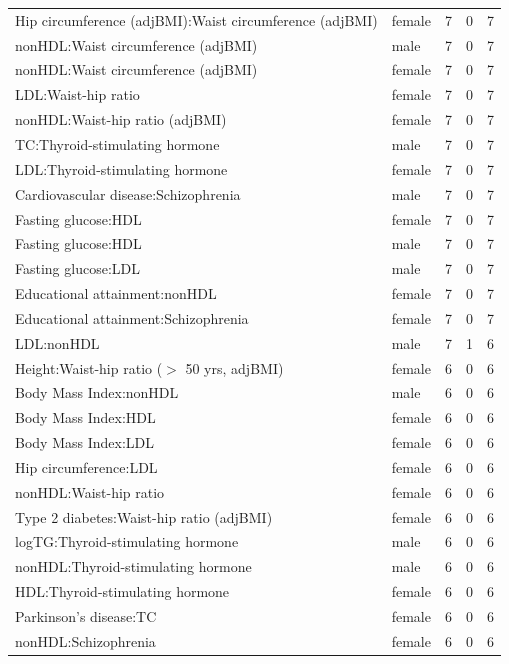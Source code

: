 \begin{table}[ht]
\begin{tabular}{llrrr}
  Hip circumference (adjBMI):Waist circumference (adjBMI) & female &   7 &   0 &   7 \\ 
  nonHDL:Waist circumference (adjBMI) & male &   7 &   0 &   7 \\ 
  nonHDL:Waist circumference (adjBMI) & female &   7 &   0 &   7 \\ 
  LDL:Waist-hip ratio & female &   7 &   0 &   7 \\ 
  nonHDL:Waist-hip ratio (adjBMI) & female &   7 &   0 &   7 \\ 
  TC:Thyroid-stimulating hormone & male &   7 &   0 &   7 \\ 
  LDL:Thyroid-stimulating hormone & female &   7 &   0 &   7 \\ 
  Cardiovascular disease:Schizophrenia & male &   7 &   0 &   7 \\ 
  Fasting glucose:HDL & female &   7 &   0 &   7 \\ 
  Fasting glucose:HDL & male &   7 &   0 &   7 \\ 
  Fasting glucose:LDL & male &   7 &   0 &   7 \\ 
  Educational attainment:nonHDL & female &   7 &   0 &   7 \\ 
  Educational attainment:Schizophrenia & female &   7 &   0 &   7 \\ 
  LDL:nonHDL & male &   7 &   1 &   6 \\ 
  Height:Waist-hip ratio ($>$ 50 yrs, adjBMI) & female &   6 &   0 &   6 \\ 
  Body Mass Index:nonHDL & male &   6 &   0 &   6 \\ 
  Body Mass Index:HDL & female &   6 &   0 &   6 \\ 
  Body Mass Index:LDL & female &   6 &   0 &   6 \\ 
  Hip circumference:LDL & female &   6 &   0 &   6 \\ 
  nonHDL:Waist-hip ratio & female &   6 &   0 &   6 \\ 
  Type 2 diabetes:Waist-hip ratio (adjBMI) & female &   6 &   0 &   6 \\ 
  logTG:Thyroid-stimulating hormone & male &   6 &   0 &   6 \\ 
  nonHDL:Thyroid-stimulating hormone & male &   6 &   0 &   6 \\ 
  HDL:Thyroid-stimulating hormone & female &   6 &   0 &   6 \\ 
  Parkinson's disease:TC & female &   6 &   0 &   6 \\ 
  nonHDL:Schizophrenia & female &   6 &   0 &   6 \\ 

\end{tabular}
\end{table}
